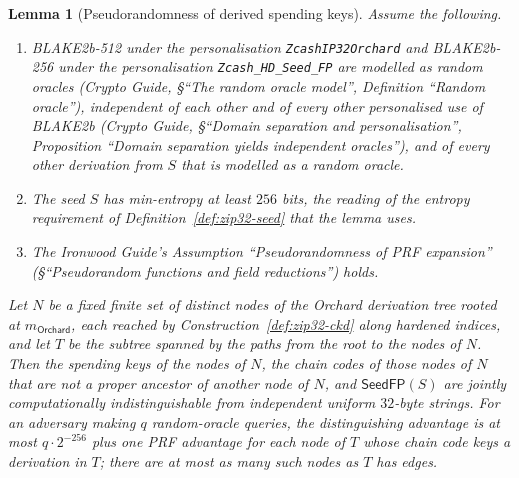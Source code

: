 \documentclass[11pt,a4paper]{article}
\newtheorem{lemma}[theorem]{Lemma}
\theoremstyle{definition}
\begin{document}
\begin{lemma}[Pseudorandomness of derived spending keys]\label{lem:zip32-prf}
Assume the following.
\begin{enumerate}[label=(\roman*)]
\item BLAKE2b-512 under the personalisation \texttt{ZcashIP32Orchard} and
  BLAKE2b-256 under the personalisation \texttt{Zcash\_HD\_Seed\_FP} are
  modelled as random oracles (\emph{Crypto Guide}, \S``The
  random oracle model'', Definition ``Random oracle''), independent of each
  other and of every other personalised use of BLAKE2b (\emph{Crypto Guide},
  \S``Domain separation and personalisation'', Proposition ``Domain
  separation yields independent oracles''), and of every other derivation
  from $S$ that is modelled as a random oracle.
\item The seed $S$ has min-entropy at least $256$ bits, the reading of the
  entropy requirement of Definition~\ref{def:zip32-seed} that the lemma
  uses.
\item The \emph{Ironwood Guide}'s Assumption ``Pseudorandomness of PRF
  expansion'' (\S``Pseudorandom functions and field reductions'') holds.
\end{enumerate}
Let $N$ be a fixed finite set of distinct nodes of the Orchard derivation
tree rooted at $m_{\mathsf{Orchard}}$, each reached by
Construction~\ref{def:zip32-ckd} along hardened indices, and let $T$ be the
subtree spanned by the paths from the root to the nodes of $N$. Then the
spending keys of the nodes of $N$, the chain codes of those nodes of $N$
that are not a proper ancestor of another node of $N$, and
$\mathsf{SeedFP}(S)$ are jointly computationally indistinguishable from
independent uniform $32$-byte strings. For an adversary making $q$
random-oracle queries, the distinguishing advantage is at most
$q \cdot 2^{-256}$ plus one PRF advantage for each node of $T$ whose chain
code keys a derivation in $T$; there are at most as many such nodes as $T$
has edges.
\end{lemma}
\end{document}
